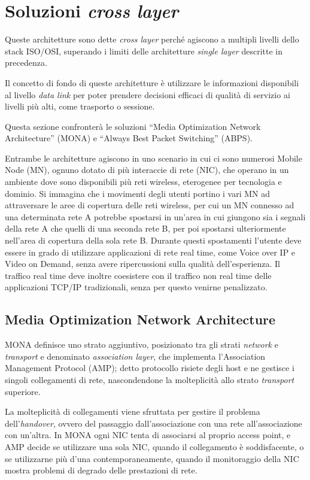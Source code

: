 \documentclass[12pt,a4paper,openright,twoside]{book}
\begin{document}
\section{Soluzioni \emph{cross layer}}
Queste architetture sono dette \emph{cross layer} perché agiscono a
multipli livelli dello stack ISO/OSI, superando i limiti delle
architetture \emph{single layer} descritte in precedenza.

Il concetto di fondo di queste architetture è utilizzare le
informazioni disponibili al livello \emph{data link} per poter
prendere decisioni efficaci di qualità di servizio ai livelli più
alti, come trasporto o sessione.

Questa sezione confronterà le soluzioni ``Media Optimization Network
Architecture'' (MONA) e ``Always Best Packet Switching'' (ABPS).

Entrambe le architetture agiscono in uno scenario in cui ci sono
numerosi Mobile Node (MN), ognuno dotato di più interaccie di rete
(NIC), che operano in un ambiente dove sono disponibili più reti
wireless, eterogenee per tecnologia e dominio. Si immagina che i
movimenti degli utenti portino i vari MN ad attraversare le aree di
copertura delle reti wireless, per cui un MN connesso ad una
determinata rete A potrebbe spostarsi in un'area in cui giungono sia i
segnali della rete A che quelli di una seconda rete B, per poi
spostarsi ulteriormente nell'area di copertura della sola rete
B. Durante questi spostamenti l'utente deve essere in grado di
utilizzare applicazioni di rete real time, come Voice over IP e Video
on Demand, senza avere ripercussioni sulla qualità dell'esperienza. Il
traffico real time deve inoltre coesistere con il traffico non real
time delle applicazioni TCP/IP tradizionali, senza per questo venirne
penalizzato.

\subsection{Media Optimization Network Architecture}

MONA definisce uno strato aggiuntivo, posizionato tra gli strati
\emph{network} e \emph{transport} e denominato \emph{association
  layer}, che implementa l'Association Management Protocol (AMP);
detto protocollo risiete degli host e ne gestisce i singoli
collegamenti di rete, nascondendone la molteplicità allo strato
\emph{transport} superiore.

La molteplicità di collegamenti viene sfruttata per gestire il
problema dell'\emph{handover}, ovvero del passaggio dall'associazione
con una rete all'associazione con un'altra. In MONA ogni NIC tenta di
associarsi al proprio access point, e AMP decide se utilizzare una
sola NIC, quando il collegamento è soddisfacente, o se utilizzarne più
d'una contemporaneamente, quando il monitoraggio della NIC mostra
problemi di degrado delle prestazioni di rete.
\end{document}
